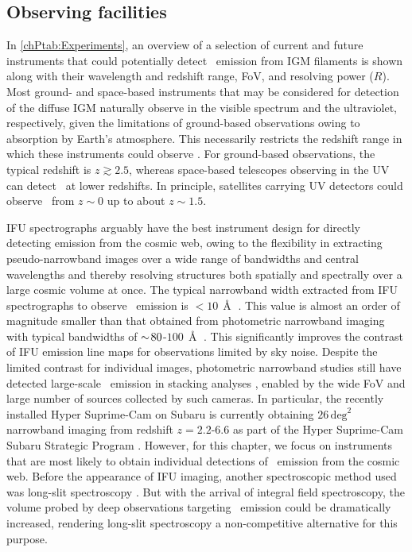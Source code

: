 \subsection{Observing facilities}
\label{chPssec:Observing facilities}

In \cref{chPtab:Experiments}, an overview of a selection of current and future instruments that could potentially detect \lya\ emission from IGM filaments is shown along with their wavelength and redshift range, FoV, and resolving power ($R$). Most ground- and space-based instruments that may be considered for detection of the diffuse IGM naturally observe in the visible spectrum and the ultraviolet, respectively, given the limitations of ground-based observations owing to absorption by Earth's atmosphere. This necessarily restricts the redshift range in which these instruments could observe \lya. For ground-based observations, the typical redshift is $z \gtrsim 2.5$, whereas space-based telescopes observing in the UV can detect \lya\ at lower redshifts. In principle, satellites carrying UV detectors could observe \lya\ from $z \sim 0$ up to about $z \sim 1.5$.

IFU spectrographs arguably have the best instrument design for directly detecting emission from the cosmic web, owing to the flexibility in extracting pseudo-narrowband images over a wide range of bandwidths and central wavelengths and thereby resolving structures both spatially and spectrally over a large cosmic volume at once. The typical narrowband width extracted from IFU spectrographs to observe \lya\ emission is $< 10 \, \Angstrom$ \citep[e.g.][]{2016A&A...587A..98W, 2018Natur.562..229W}. This value is almost an order of magnitude smaller than that obtained from photometric narrowband imaging with typical bandwidths of $\sim \!80$-$100 \, \Angstrom$ \citep{2011ApJ...736..160S, 2018PASJ...70S..13O}. This significantly improves the contrast of IFU emission line maps for observations limited by sky noise. Despite the limited contrast for individual images, photometric narrowband studies still have detected large-scale \lya\ emission in stacking analyses \citep[e.g.][]{2011ApJ...736..160S, 2012MNRAS.425..878M, 2021ApJ...916...22K}, enabled by the wide FoV and large number of sources collected by such cameras. In particular, the recently installed Hyper Suprime-Cam on Subaru is currently obtaining $26 \, \mathrm{deg}^2$ narrowband imaging from redshift $z=2.2$-$6.6$ as part of the Hyper Suprime-Cam Subaru Strategic Program \citep[e.g.][]{2018PASJ...70S..13O}. However, for this chapter, we focus on instruments that are most likely to obtain individual detections of \lya\ emission from the cosmic web. Before the appearance of IFU imaging, another spectroscopic method used was long-slit spectroscopy \citep[as in e.g.][]{2008ApJ...681..856R}. But with the arrival of integral field spectroscopy, the volume probed by deep observations targeting \lya\ emission could be dramatically increased, rendering long-slit spectroscopy a non-competitive alternative for this purpose.

